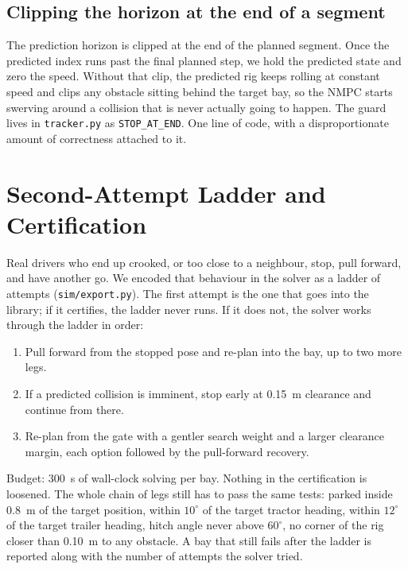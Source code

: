 \documentclass[conference]{IEEEtran}
\begin{document}
\subsection{Clipping the horizon at the end of a segment}

The prediction horizon is clipped at the end of the planned segment.
Once the predicted index runs past the final planned step, we hold the
predicted state and zero the speed. Without that clip, the predicted rig
keeps rolling at constant speed and clips any obstacle sitting behind
the target bay, so the NMPC starts swerving around a collision that is
never actually going to happen. The guard lives in \texttt{tracker.py}
as \texttt{STOP\_AT\_END}. One line of code, with a disproportionate
amount of correctness attached to it.

\section{Second-Attempt Ladder and Certification}
\label{sec:ladder}

Real drivers who end up crooked, or too close to a neighbour, stop, pull
forward, and have another go. We encoded that behaviour in the solver as
a ladder of attempts (\texttt{sim/export.py}). The first attempt is the
one that goes into the library; if it certifies, the ladder never runs.
If it does not, the solver works through the ladder in order:

\begin{enumerate}
    \item Pull forward from the stopped pose and re-plan into the bay,
          up to two more legs.
    \item If a predicted collision is imminent, stop early at
          \SI{0.15}{\meter} clearance and continue from there.
    \item Re-plan from the gate with a gentler search weight and a
          larger clearance margin, each option followed by the
          pull-forward recovery.
\end{enumerate}

Budget: \SI{300}{\second} of wall-clock solving per bay. Nothing in the
certification is loosened. The whole chain of legs still has to pass the
same tests: parked inside \SI{0.8}{\meter} of the target position,
within $10^{\circ}$ of the target tractor heading, within $12^{\circ}$
of the target trailer heading, hitch angle never above $60^{\circ}$, no
corner of the rig closer than \SI{0.10}{\meter} to any obstacle. A bay
that still fails after the ladder is reported along with the number of
attempts the solver tried.
\end{document}
